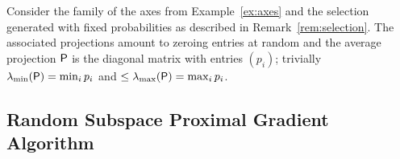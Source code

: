 {
\begin{example}\label{ex:P}
Consider the family of the axes from Example~\ref{ex:axes} and the selection generated with fixed probabilities as described in Remark~\ref{rem:selection}. The associated projections amount to zeroing entries at random and the average projection ${\mathsf{P}}$ is the diagonal matrix with entries $(p_i)$; trivially $\lambda_{\min}({\mathsf{P}})= \min_i p_i$ and $\leq \lambda_{\max}({\mathsf{P}}) = \max_i p_i$.
\end{example}}

\subsection{Random Subspace Proximal Gradient Algorithm} \label{sec:algo}


